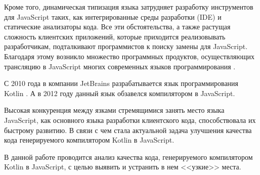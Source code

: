 Кроме того, динамическая типизация языка затрудняет разработку инструментов для JavaScript таких, как интегрированные среды разработки (IDE) и статические анализаторы кода. Все эти обстоятельства, а также растущая сложность клиентских приложений, которые приходится реализовывать разработчикам, подталкивают программистов к поиску замены для JavaScript. Благодаря этому возникло множество программных продуктов, осуществляющих трансляцию в JavaScript многих современных языков программирования \cite{AltJS}.

С 2010 года в компании JetBrains разрабатывается язык программирования Kotlin \cite{KotlinOSP}. А в 2012 году данный язык обзавелся компилятором в JavaScript.

Высокая конкуренция между язками стремящимися занять место языка JavaScript, как основного языка разработки клиентского кода, способствовала их быстрому развитию. В связи с чем стала актуальной задача улучшения качества кода генерируемого компилятором Kotlin в JavaScript.

В данной работе проводится анализ качества кода, генерируемого компилятором Kotlin в JavaScript, с целью выявить и устранить в нем <<узкие>> места. %





